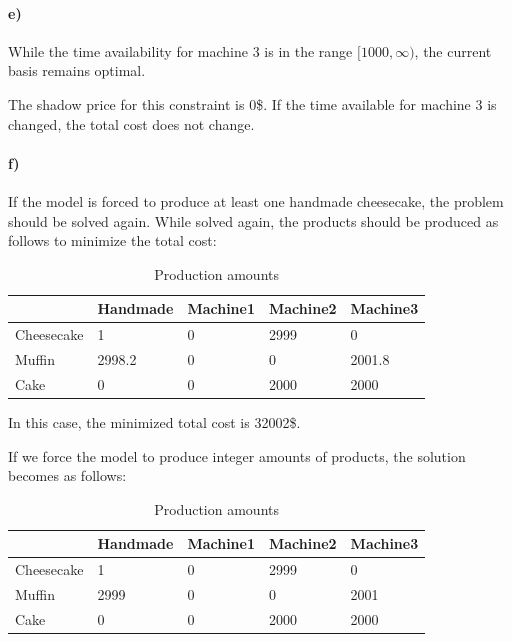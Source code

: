 \documentclass{article}
\begin{document}
\paragraph*{e)}
While the time availability for machine 3 is in the range $[1000, \infty)$, the current basis remains optimal.

The shadow price for this constraint is 0\$.
If the time available for machine 3 is changed, the total cost does not change.

\paragraph*{f)}
If the model is forced to produce at least one handmade cheesecake, the problem should be solved again.
While solved again, the products should be produced as follows to minimize the total cost:
\begin{table}[H]
    \centering
    \caption{Production amounts}
    \begin{tabular}{|l|l|l|l|l|}
    \hline
               & Handmade & Machine1 & Machine2 & Machine3 \\ \hline
    Cheesecake & 1        & 0        & 2999     & 0        \\ \hline
    Muffin     & 2998.2     & 0        & 0        & 2001.8     \\ \hline
    Cake       & 0        & 0        & 2000     & 2000     \\ \hline
    \end{tabular}
\end{table}

In this case, the minimized total cost is 32002\$.

If we force the model to produce integer amounts of products, the solution becomes as follows:

\begin{table}[H]
    \centering
    \caption{Production amounts}
    \begin{tabular}{|l|l|l|l|l|}
    \hline
               & Handmade & Machine1 & Machine2 & Machine3 \\ \hline
    Cheesecake & 1        & 0        & 2999     & 0        \\ \hline
    Muffin     & 2999     & 0        & 0        & 2001     \\ \hline
    Cake       & 0        & 0        & 2000     & 2000     \\ \hline
\end{tabular}
\end{table}
\end{document}
